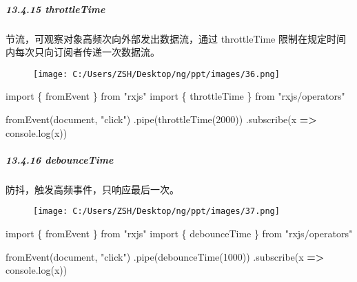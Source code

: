\documentclass[
]{article}
\newenvironment{Shaded}{}{}
\newcommand{\BuiltInTok}[1]{#1}
\newcommand{\DecValTok}[1]{\textcolor[rgb]{0.25,0.63,0.44}{#1}}
\newcommand{\FunctionTok}[1]{\textcolor[rgb]{0.02,0.16,0.49}{#1}}
\newcommand{\ImportTok}[1]{#1}
\newcommand{\KeywordTok}[1]{\textcolor[rgb]{0.00,0.44,0.13}{\textbf{#1}}}
\newcommand{\NormalTok}[1]{#1}
\newcommand{\OperatorTok}[1]{\textcolor[rgb]{0.40,0.40,0.40}{#1}}
\newcommand{\StringTok}[1]{\textcolor[rgb]{0.25,0.44,0.63}{#1}}
\begin{document}
\hypertarget{13415-throttletime}{%
\subparagraph{13.4.15 throttleTime}\label{13415-throttletime}}

节流，可观察对象高频次向外部发出数据流，通过 throttleTime
限制在规定时间内每次只向订阅者传递一次数据流。

\begin{figure}
\centering
\texttt{[image: C:/Users/ZSH/Desktop/ng/ppt/images/36.png]}
\caption{}
\end{figure}

\begin{Shaded}
\begin{Highlighting}[]
\ImportTok{import}\NormalTok{ \{ fromEvent \} }\ImportTok{from} \StringTok{"rxjs"}
\ImportTok{import}\NormalTok{ \{ throttleTime \} }\ImportTok{from} \StringTok{"rxjs/operators"}

\FunctionTok{fromEvent}\NormalTok{(}\BuiltInTok{document}\OperatorTok{,} \StringTok{"click"}\NormalTok{)}
  \OperatorTok{.}\FunctionTok{pipe}\NormalTok{(}\FunctionTok{throttleTime}\NormalTok{(}\DecValTok{2000}\NormalTok{))}
  \OperatorTok{.}\FunctionTok{subscribe}\NormalTok{(x }\KeywordTok{=\textgreater{}} \BuiltInTok{console}\OperatorTok{.}\FunctionTok{log}\NormalTok{(x))}
\end{Highlighting}
\end{Shaded}

\hypertarget{13416-debouncetime}{%
\subparagraph{13.4.16 debounceTime}\label{13416-debouncetime}}

防抖，触发高频事件，只响应最后一次。

\begin{figure}
\centering
\texttt{[image: C:/Users/ZSH/Desktop/ng/ppt/images/37.png]}
\caption{}
\end{figure}

\begin{Shaded}
\begin{Highlighting}[]
\ImportTok{import}\NormalTok{ \{ fromEvent \} }\ImportTok{from} \StringTok{"rxjs"}
\ImportTok{import}\NormalTok{ \{ debounceTime \} }\ImportTok{from} \StringTok{"rxjs/operators"}

\FunctionTok{fromEvent}\NormalTok{(}\BuiltInTok{document}\OperatorTok{,} \StringTok{"click"}\NormalTok{)}
  \OperatorTok{.}\FunctionTok{pipe}\NormalTok{(}\FunctionTok{debounceTime}\NormalTok{(}\DecValTok{1000}\NormalTok{))}
  \OperatorTok{.}\FunctionTok{subscribe}\NormalTok{(x }\KeywordTok{=\textgreater{}} \BuiltInTok{console}\OperatorTok{.}\FunctionTok{log}\NormalTok{(x))}
\end{Highlighting}
\end{Shaded}
\end{document}

